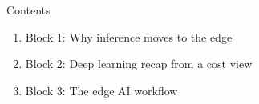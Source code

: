 \begin{frame}{Contents}
  \begin{enumerate}
    \item Block 1: Why inference moves to the edge
    \item Block 2: Deep learning recap from a cost view
    \item Block 3: The edge AI workflow
  \end{enumerate}
\end{frame}
